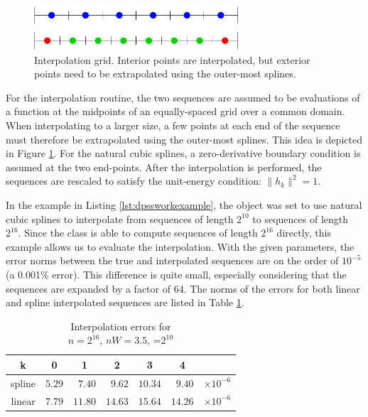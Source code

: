 \begin{figure}[!b]
    \centering
    \includegraphics[width=3in]{pics/interp.pdf}
    \caption[Interpolation grid]{Interpolation grid.  \textcolor{green!60!black}{Interior points} are interpolated, but \textcolor{red!70!black}{exterior points} need to be extrapolated using the outer-most splines.\label{fig:interpgrid}}
\end{figure}

For the interpolation routine, the two sequences are assumed to be evaluations of a function at the midpoints of an equally-spaced grid over a common domain.  When interpolating to a larger size, a few points at each end of the sequence must therefore be extrapolated using the outer-most splines.  This idea is depicted in Figure \ref{fig:interpgrid}.  For the natural cubic splines, a zero-derivative boundary condition is assumed at the two end-points.  After the interpolation is performed, the sequences are rescaled to satisfy the unit-energy condition: $\|h_k\|^2 =1$.

In the example in Listing \ref{lst:dpssworkexample}, the  object was set to use natural cubic splines to interpolate from sequences of length $2^{10}$ to sequences of length $2^{16}$.  Since the  class is able to compute sequences of length $2^{16}$ directly, this example allows us to evaluate the interpolation.  With the given parameters, the error norms between the true and interpolated sequences are on the order of  $10^{-5}$ (a 0.001\% error).  This difference is quite small, especially considering that the sequences are expanded by a factor of $64$.  The norms of the errors for both linear and spline interpolated sequences are listed in Table \ref{tbl:interperrors}.

\begin{table}
    \caption[Example interpolation errors]{Interpolation errors for \\$n=2^{16}$, $nW=3.5$, =$2^{10}$ \label{tbl:interperrors}}
    \centering
    \renewcommand{\arraystretch}{1.3}
    \vspace*{-0.8em}
    \begin{tabular}{c|rrrrrl}
        \hline\hline
          k & \multicolumn{1}{c}{0} & \multicolumn{1}{c}{1} & \multicolumn{1}{c}{2} & \multicolumn{1}{c}{3} & \multicolumn{1}{c}{4}\\
        \hline
        spline & $5.29$ & $7.40$ & $9.62$ & $10.34$ & $9.40$ & $\times10^{-6}$\\
        linear & $7.79$ & $11.80$ & $14.63$ & $15.64$ & $14.26$ & $\times10^{-6}$\\
        \hline 
    \end{tabular}
\end{table}

